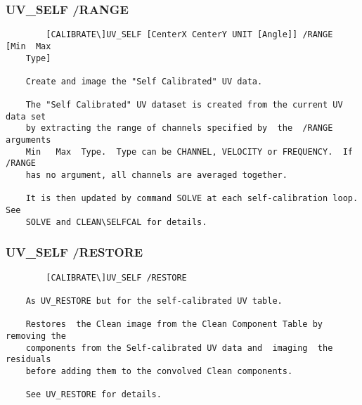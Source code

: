 \subsubsection{UV\_SELF /RANGE}
\begin{verbatim}
        [CALIBRATE\]UV_SELF [CenterX CenterY UNIT [Angle]] /RANGE  [Min  Max
    Type]

    Create and image the "Self Calibrated" UV data.

    The "Self Calibrated" UV dataset is created from the current UV data set
    by extracting the range of channels specified by  the  /RANGE  arguments
    Min   Max  Type.  Type can be CHANNEL, VELOCITY or FREQUENCY.  If /RANGE
    has no argument, all channels are averaged together.

    It is then updated by command SOLVE at each self-calibration loop.   See
    SOLVE and CLEAN\SELFCAL for details.

\end{verbatim}
\subsubsection{UV\_SELF /RESTORE}
\begin{verbatim}
        [CALIBRATE\]UV_SELF /RESTORE

    As UV_RESTORE but for the self-calibrated UV table.

    Restores  the Clean image from the Clean Component Table by removing the
    components from the Self-calibrated UV data and  imaging  the  residuals
    before adding them to the convolved Clean components.

    See UV_RESTORE for details.


\end{verbatim}
